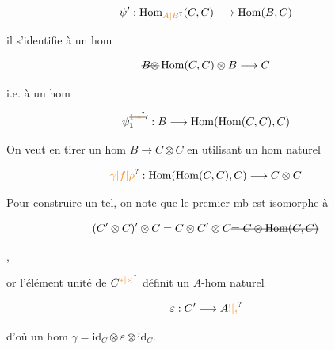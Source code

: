 \[
\psi':\operatorname{Hom}_{\unsure{A|B}}(C,C)\longrightarrow\operatorname{Hom}(B,C)
\]

il s'identifie à un hom

\[
\deleted{B\otimes}\operatorname{Hom}(C,C)\otimes B\longrightarrow C
\]

i.e. à un hom

\[
\psi_1^{\deleted{\unsure{1|*}}\prime}:B\longrightarrow\operatorname{Hom}(\operatorname{Hom}(C,C),C)
\]

On veut en tirer un hom $B\to C\otimes C$ en utilisant un hom naturel

\[
\unsure{\gamma|f|\rho}:\operatorname{Hom}(\operatorname{Hom}(C,C),C)\longrightarrow C\otimes C
\]

Pour construire un tel, on note que le premier mb est isomorphe à

\[
(C'\otimes C)'\otimes C=C\otimes C'\otimes C\deleted{=C\otimes\operatorname{Hom}(C,C)}
\]

,

or l'élément unité de $C^{\unsure{*|\times}}$ définit un $A$-hom naturel

\[
\varepsilon:C'\longrightarrow A\unsure{!|,}
\]

d'où un hom $\gamma=\mathrm{id}_C\otimes\varepsilon\otimes\mathrm{id}_C$.
